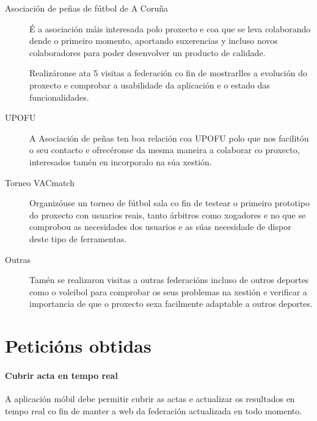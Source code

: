   \begin{description}

  \item [Asociación de peñas de fútbol de A Coruña]
  É a asociación máis interesada polo proxecto e coa que se leva colaborando 
dende o primeiro momento, aportando suxerencias y incluso novos colaboradores 
para poder desenvolver un producto de calidade.

  Realizáronse ata 5 visitas a federación co fin de mostrarlles a evolución do 
proxecto e comprobar a usabilidade da aplicación e o estado das funcionalidades.

  \item [UPOFU]
  A Asociación de peñas ten boa relación coa UPOFU polo que nos facilitóu o seu 
contacto e ofrecéronse da mesma maneira a colaborar co proxecto, interesados 
tamén en incorporalo na súa xestión.

  \item [Torneo VACmatch]
  Organizóuse un torneo de fútbol sala co fin de testear o primeiro prototipo 
do proxecto con usuarios reais, tanto árbitros como xogadores e no que se 
comprobou as necesidades dos usuarios e as súas necesidade de dispor deste tipo 
de ferramentas.

  \item [Outras]
  Tamén se realizaron visitas a outras federacións incluso de outros deportes 
como o voleibol para comprobar os seus problemas na xestión e verificar a 
importancia de que o proxecto sexa facilmente adaptable a outros deportes.
  
  \end{description}

  \section{Peticións obtidas}
  \label{sec:analisis:obtido}


  
  \paragraph{Cubrir acta en tempo real}
  A aplicación móbil debe permitir cubrir as actas e actualizar os resultados 
en tempo real co fin de manter a web da federación actualizada en todo momento.

